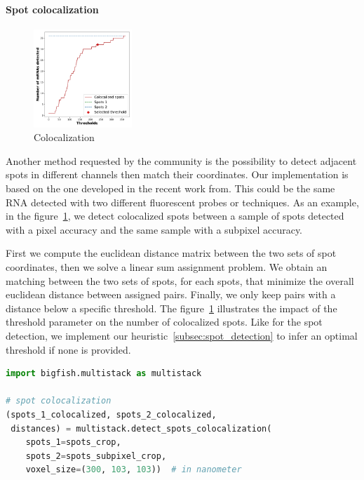 \paragraph{Spot colocalization}

\begin{figure}
  \begin{center}
    \includegraphics[width=0.33\textwidth]{figures/chapter2/colocalization_elbow}
  \end{center}
  \caption{Colocalization}
  \label{fig:elbow_colocalization}
\end{figure}

Another method requested by the community is the possibility to detect adjacent spots in different channels then match their coordinates.
Our implementation is based on the one developed in the recent work from\cite{CORNES_2022}.
This could be the same \ac{RNA} detected with two different fluorescent probes or techniques.
As an example, in the figure~\ref{fig:elbow_colocalization}, we detect colocalized spots between a sample of spots detected with a pixel accuracy and the same sample with a subpixel accuracy.

First we compute the euclidean distance matrix between the two sets of spot coordinates, then we solve a linear sum assignment problem\cite{crouse_linear_assignment_2016, 2020SciPy-NMeth}.
We obtain an matching between the two sets of spots, for each spots, that minimize the overall euclidean distance between assigned pairs.
Finally, we only keep pairs with a distance below a specific threshold.
The figure~\ref{fig:elbow_colocalization} illustrates the impact of the threshold parameter on the number of colocalized spots.
Like for the spot detection, we implement our heuristic~\ref{subsec:spot_detection} to infer an optimal threshold if none is provided.\\

\begin{minipage}{0.9\textwidth}
\begin{lstlisting}[language=Python]
import bigfish.multistack as multistack

# spot colocalization
(spots_1_colocalized, spots_2_colocalized,
 distances) = multistack.detect_spots_colocalization(
	spots_1=spots_crop,
	spots_2=spots_subpixel_crop,
	voxel_size=(300, 103, 103))  # in nanometer
\end{lstlisting}
\end{minipage}

